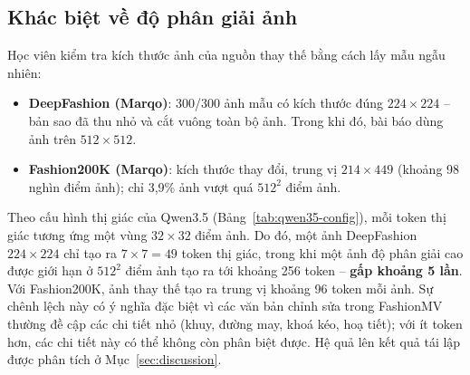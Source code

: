 \subsection{Khác biệt về độ phân giải ảnh}\label{sec:resolution}

Học viên kiểm tra kích thước ảnh của nguồn thay thế bằng cách lấy mẫu ngẫu nhiên:
\begin{itemize}
    \item \textbf{DeepFashion (Marqo)}: 300/300 ảnh mẫu có kích thước đúng $224 \times 224$ -- bản sao đã thu nhỏ và cắt vuông toàn bộ ảnh. Trong khi đó, bài báo dùng ảnh trên $512 \times 512$.
    \item \textbf{Fashion200K (Marqo)}: kích thước thay đổi, trung vị $214 \times 449$ (khoảng 98 nghìn điểm ảnh); chỉ 3,9\% ảnh vượt quá $512^2$ điểm ảnh.
\end{itemize}
Theo cấu hình thị giác của Qwen3.5 (Bảng~\ref{tab:qwen35-config}), mỗi token thị giác tương ứng một vùng $32 \times 32$ điểm ảnh. Do đó, một ảnh DeepFashion $224 \times 224$ chỉ tạo ra $7 \times 7 = 49$ token thị giác, trong khi một ảnh độ phân giải cao được giới hạn ở $512^2$ điểm ảnh tạo ra tới khoảng 256 token -- \textbf{gấp khoảng 5 lần}. Với Fashion200K, ảnh thay thế tạo ra trung vị khoảng 96 token mỗi ảnh. Sự chênh lệch này có ý nghĩa đặc biệt vì các văn bản chỉnh sửa trong FashionMV thường đề cập các chi tiết nhỏ (khuy, đường may, khoá kéo, hoạ tiết); với ít token hơn, các chi tiết này có thể không còn phân biệt được. Hệ quả lên kết quả tái lập được phân tích ở Mục~\ref{sec:discussion}.
